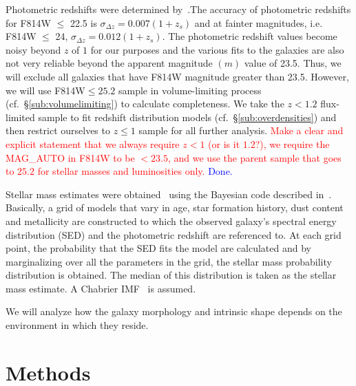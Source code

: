 \documentclass[twocolumn,useAMS,usenatbib]{mn2e}
\newcommand{\rachel}[1]{{\textcolor{red}{#1}}}
\newcommand{\arun}[1]{{\textcolor{blue}{#1}}}
\begin{document}
Photometric redshifts were determined by~\cite{COSMOS_Photoz_30band}.The accuracy of photometric redshifts for F814W $\le$ 22.5 is $\sigma_{\Delta z} = 0.007(1+z_s)$ and at fainter magnitudes, i.e. F814W $\le$ 24, $\sigma_{\Delta z} = 0.012(1+z_s)$.
The photometric redshift values become noisy beyond $z$ of $1$ for our purposes and the various fits to the galaxies are also not very reliable beyond the apparent magnitude $(m)$ value of 23.5. 
Thus, we will exclude all galaxies that have F814W magnitude greater than 23.5. However, we will use F814W$\le 25.2$ sample in volume-limiting process (cf.~\S\ref{sub:volumelimiting}) to calculate completeness.  We take the $z<1.2$ flux-limited sample to fit redshift distribution models (cf.~\S\ref{sub:overdensities}) and then restrict ourselves to $z\le1$ sample for all further analysis.
\rachel{Make a clear and explicit statement that we always require $z<1$ (or is it $1.2$?), we require the MAG\_AUTO in F814W to be $<23.5$, and we use the parent sample that goes to $25.2$ for stellar masses and luminosities only.}
\arun{Done.}

Stellar mass estimates were obtained~\citep{COSMOS_XRAY} using the Bayesian code described in~\cite{KEVIN_MSTAR}. Basically, a grid of models that vary in age, star formation history, dust content and metallicity
are constructed to which the observed galaxy's spectral energy distribution (SED) and the photometric redshift are referenced to. At each grid point, the probability that the 
SED fits the model are calculated and by marginalizing over all the parameters in the grid, the stellar mass probability distribution is obtained. The median of this distribution
is taken as the stellar mass estimate. A Chabrier IMF~\citep{ChabrierIMF} is assumed.
  
We will analyze how the galaxy morphology and intrinsic shape depends on
the environment in which they reside.

\section{Methods}
\label{S:methods}
\end{document}
